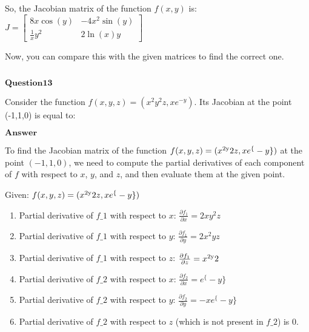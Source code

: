 \documentclass[11pt]{article}
\makeatletter
\newcommand{\boxspacing}{\kern\kvtcb@left@rule\kern\kvtcb@boxsep}
\newcommand{\prompt}[4]{
        {\ttfamily\llap{{\color{#2}[#3]:\hspace{3pt}#4}}\vspace{-\baselineskip}}
    }
\makeatother
\begin{document}
So, the Jacobian matrix of the function $ f(x, y) $ is:
$ J =\begin{bmatrix} 8x \cos(y) & -4x^2 \sin(y) \\ \frac{1}{x}y^2 & 2\ln(x)y \end{bmatrix}$

Now, you can compare this with the given matrices to find the correct
one.

    \begin{tcolorbox}[breakable, size=fbox, boxrule=1pt, pad at break*=1mm,colback=cellbackground, colframe=cellborder]
\prompt{In}{incolor}{ }{\boxspacing}
\begin{Verbatim}[commandchars=\\\{\}]

\end{Verbatim}
\end{tcolorbox}

    $\textbf{Question13}$

Consider the function $f(x,y,z)=(x^2y^2z, xe^{-y})$. Its Jacobian at
the point (-1,1,0) is equal to:

$\textbf{Answer}$

    To find the Jacobian matrix of the function $ f(x, y, z) =
(x\textsuperscript{2y}2z, xe^\{-y\}) $ at the point $ (-1, 1, 0)
$, we need to compute the partial derivatives of each component of $ f
$ with respect to $ x $, $ y $, and $ z $, and then evaluate them
at the given point.

Given: $ f(x, y, z) = (x\textsuperscript{2y}2z, xe^\{-y\}) $

\begin{enumerate}
\def\labelenumi{\arabic{enumi}.}
\item
  Partial derivative of $ f\_1 $ with respect to $ x $: $
  \frac{\partial f_1}{\partial x} = 2xy^2z $
\item
  Partial derivative of $ f\_1 $ with respect to $ y $: $
  \frac{\partial f_1}{\partial y} = 2x^2yz $
\item
  Partial derivative of $ f\_1 $ with respect to $ z $: $
  \frac{\partial f_1}{\partial z} = x\textsuperscript{2y}2 $
\item
  Partial derivative of $ f\_2 $ with respect to $ x $: $
  \frac{\partial f_2}{\partial x} = e^\{-y\} $
\item
  Partial derivative of $ f\_2 $ with respect to $ y $: $
  \frac{\partial f_2}{\partial y} = -xe^\{-y\} $
\item
  Partial derivative of $ f\_2 $ with respect to $ z $ (which is not
  present in $ f\_2 $) is $0$.
\end{enumerate}
\end{document}
